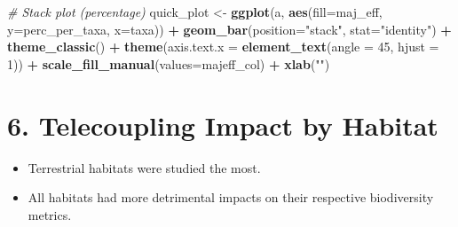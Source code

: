 \documentclass[
]{article}
\newenvironment{Shaded}{\begin{snugshade}}{\end{snugshade}}
\newcommand{\CommentTok}[1]{\textcolor[rgb]{0.56,0.35,0.01}{\textit{#1}}}
\newcommand{\DataTypeTok}[1]{\textcolor[rgb]{0.13,0.29,0.53}{#1}}
\newcommand{\DecValTok}[1]{\textcolor[rgb]{0.00,0.00,0.81}{#1}}
\newcommand{\KeywordTok}[1]{\textcolor[rgb]{0.13,0.29,0.53}{\textbf{#1}}}
\newcommand{\NormalTok}[1]{#1}
\newcommand{\OperatorTok}[1]{\textcolor[rgb]{0.81,0.36,0.00}{\textbf{#1}}}
\newcommand{\StringTok}[1]{\textcolor[rgb]{0.31,0.60,0.02}{#1}}
\providecommand{\tightlist}{%
  \setlength{\itemsep}{0pt}\setlength{\parskip}{0pt}}
\begin{document}
\begin{Shaded}
\begin{Highlighting}[]
\CommentTok{# Stack plot (percentage)}
\NormalTok{  quick_plot <-}\StringTok{ }\KeywordTok{ggplot}\NormalTok{(a, }\KeywordTok{aes}\NormalTok{(}\DataTypeTok{fill=}\NormalTok{maj_eff, }\DataTypeTok{y=}\NormalTok{perc_per_taxa, }\DataTypeTok{x=}\NormalTok{taxa)) }\OperatorTok{+}\StringTok{ }
\StringTok{                }\KeywordTok{geom_bar}\NormalTok{(}\DataTypeTok{position=}\StringTok{"stack"}\NormalTok{, }\DataTypeTok{stat=}\StringTok{"identity"}\NormalTok{) }\OperatorTok{+}
\StringTok{                }\KeywordTok{theme_classic}\NormalTok{() }\OperatorTok{+}
\StringTok{                }\KeywordTok{theme}\NormalTok{(}\DataTypeTok{axis.text.x =} \KeywordTok{element_text}\NormalTok{(}\DataTypeTok{angle =} \DecValTok{45}\NormalTok{, }\DataTypeTok{hjust =} \DecValTok{1}\NormalTok{)) }\OperatorTok{+}
\StringTok{                }\KeywordTok{scale_fill_manual}\NormalTok{(}\DataTypeTok{values=}\NormalTok{majeff_col) }\OperatorTok{+}
\StringTok{                }\KeywordTok{xlab}\NormalTok{(}\StringTok{""}\NormalTok{)}
\end{Highlighting}
\end{Shaded}

\hypertarget{telecoupling-impact-by-habitat}{%
\section{6. Telecoupling Impact by
Habitat}\label{telecoupling-impact-by-habitat}}

\begin{itemize}
\tightlist
\item
  Terrestrial habitats were studied the most.
\item
  All habitats had more detrimental impacts on their respective
  biodiversity metrics.
\end{itemize}
\end{document}
